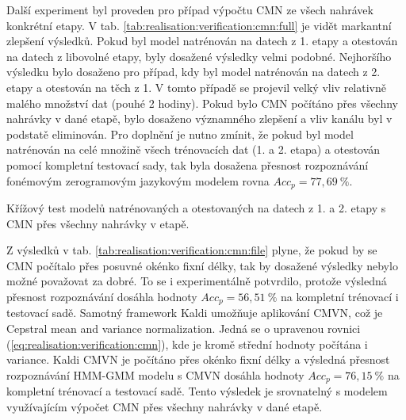 Další experiment byl proveden pro případ výpočtu CMN ze všech nahrávek konkrétní etapy.
V tab. \ref{tab:realisation:verification:cmn:full} je vidět markantní zlepšení výsledků.
Pokud byl model natrénován na datech z 1. etapy a otestován na datech z libovolné etapy, byly dosažené výsledky velmi podobné.
Nejhoršího výsledku bylo dosaženo pro případ, kdy byl model natrénován na datech z 2. etapy a otestován na těch z 1.
V tomto případě se projevil velký vliv relativně malého množství dat (pouhé 2 hodiny).
Pokud bylo CMN počítáno přes všechny nahrávky v dané etapě, bylo dosaženo významného zlepšení a vliv kanálu byl v podstatě eliminován.
Pro doplnění je nutno zmínit, že pokud byl model natrénován na celé množině všech trénovacích dat (1. a 2. etapa) a otestován pomocí kompletní testovací sady, tak byla dosažena přesnost rozpoznávání fonémovým zerogramovým jazykovým modelem rovna $Acc_{p} = 77,69\ \%$.


\begin{table}[htpb]
  \centering
  \def\arraystretch{1.5}
  \caption[Křížový test s CMN přes všechny nahrávky]{Křížový test modelů natrénovaných a otestovaných na datech z 1. a 2. etapy s CMN  přes všechny nahrávky v etapě.}
  \label{tab:realisation:verification:cmn:full}
\end{table}

Z výsledků v tab. \ref{tab:realisation:verification:cmn:file} plyne, že pokud by se CMN počítalo přes posuvné okénko fixní délky, tak by dosažené výsledky nebylo možné považovat za dobré.
To se i experimentálně potvrdilo, protože výsledná přesnost rozpoznávání dosáhla hodnoty $Acc_{p} = 56,51\ \%$ na kompletní trénovací i testovací sadě.
Samotný framework Kaldi umožňuje aplikování CMVN, což je Cepstral mean and variance normalization.
Jedná se o upravenou rovnici (\ref{eq:realisation:verification:cmn}), kde je kromě střední hodnoty počítána i variance.
Kaldi CMVN je počítáno přes okénko fixní délky a výsledná přesnost rozpoznávání HMM-GMM modelu s CMVN dosáhla hodnoty $Acc_{p} = 76,15\ \%$ na kompletní trénovací a testovací sadě.
Tento výsledek je srovnatelný s modelem využívajícím výpočet CMN přes všechny nahrávky v dané etapě.

